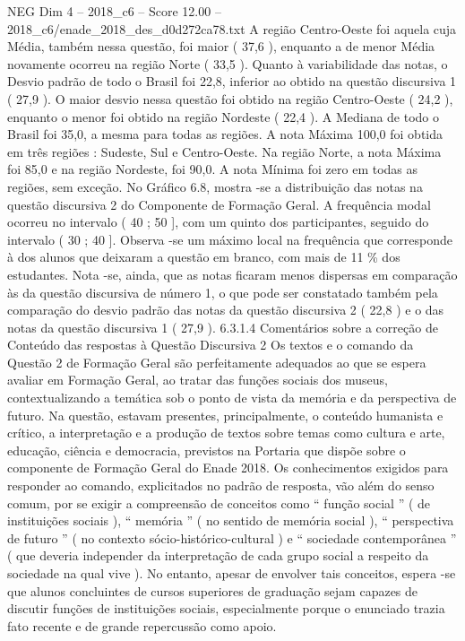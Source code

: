 \begin{textsample}{NEG Dim 4 – 2018\_c6 – Score 12.00 – 2018\_c6/enade\_2018\_des\_d0d272ca78.txt}
A região Centro-Oeste foi aquela cuja Média, também nessa questão, foi maior ( 37,6 ), enquanto a de menor Média novamente ocorreu na região Norte ( 33,5 ).
Quanto à variabilidade das notas, o Desvio padrão de todo o Brasil foi 22,8, inferior ao obtido na questão discursiva 1 ( 27,9 ).
O maior desvio nessa questão foi obtido na região Centro-Oeste ( 24,2 ), enquanto o menor foi obtido na região Nordeste ( 22,4 ).
A Mediana de todo o Brasil foi 35,0, a mesma para todas as regiões.
A nota Máxima 100,0 foi obtida em três regiões : Sudeste, Sul e Centro-Oeste.
Na região Norte, a nota Máxima foi 85,0 e na região Nordeste, foi 90,0.
A nota Mínima foi zero em todas as regiões, sem exceção.
No Gráfico 6.8, mostra -se a distribuição das notas na questão discursiva 2 do Componente de Formação Geral.
A frequência modal ocorreu no intervalo ( 40 ; 50 ], com um quinto dos participantes, seguido do intervalo ( 30 ; 40 ].
Observa -se um máximo local na frequência que corresponde à dos alunos que deixaram a questão em branco, com mais de 11 \% dos estudantes.
Nota -se, ainda, que as notas ficaram menos dispersas em comparação às da questão discursiva de número 1, o que pode ser constatado também pela comparação do desvio padrão das notas da questão discursiva 2 ( 22,8 ) e o das notas da questão discursiva 1 ( 27,9 ). 6.3.1.4 Comentários sobre a correção de Conteúdo das respostas à Questão Discursiva 2 Os textos e o comando da Questão 2 de Formação Geral são perfeitamente adequados ao que se espera avaliar em Formação Geral, ao tratar das funções sociais dos museus, contextualizando a temática sob o ponto de vista da memória e da perspectiva de futuro.
Na questão, estavam presentes, principalmente, o conteúdo humanista e crítico, a interpretação e a produção de textos sobre temas como cultura e arte, educação, ciência e democracia, previstos na Portaria que dispõe sobre o componente de Formação Geral do Enade 2018.
Os conhecimentos exigidos para responder ao comando, explicitados no padrão de resposta, vão além do senso comum, por se exigir a compreensão de conceitos como “ função social ” ( de instituições sociais ), “ memória ” ( no sentido de memória social ), “ perspectiva de futuro ” ( no contexto sócio-histórico-cultural ) e “ sociedade contemporânea ” ( que deveria independer da interpretação de cada grupo social a respeito da sociedade na qual vive ).
No entanto, apesar de envolver tais conceitos, espera -se que alunos concluintes de cursos superiores de graduação sejam capazes de discutir funções de instituições sociais, especialmente porque o enunciado trazia fato recente e de grande repercussão como apoio.

\end{textsample}
